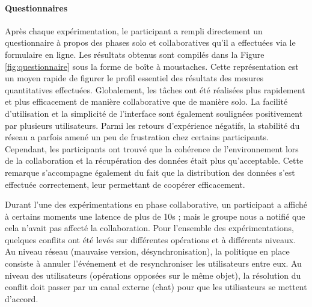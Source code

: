 \paragraph{Questionnaires}
Après chaque expérimentation, le participant a rempli directement un questionnaire 
à propos des phases solo et collaboratives qu'il a effectuées via le formulaire en 
ligne. Les résultats obtenus sont compilés dans la Figure 
\ref{fig:questionnaire} sous la forme de boîte à moustaches. Cette représentation 
est un moyen rapide de figurer le profil essentiel des résultats des mesures 
quantitatives effectuées.
Globalement, les tâches ont été réalisées plus rapidement et plus efficacement 
de manière collaborative que de manière solo. La facilité d'utilisation et la 
simplicité de l'interface sont également soulignées positivement par plusieurs 
utilisateurs. Parmi les retours d'expérience négatifs, la stabilité du 
réseau a parfois amené un peu de frustration chez certains participants. 
Cependant, les participants ont trouvé que la cohérence de l'environnement lors de 
la collaboration et la récupération des données était plus qu'acceptable. Cette 
remarque s'accompagne également du fait que la distribution des données s'est 
effectuée correctement, leur permettant de coopérer efficacement.

Durant l'une des expérimentations en phase collaborative, un 
participant a affiché à certains moments une latence de plus de 10s ; mais 
le groupe nous a notifié que cela n'avait pas affecté la collaboration. Pour l'ensemble des 
expérimentations, quelques conflits ont été levés sur différentes opérations et à
différents niveaux. Au niveau réseau (mauvaise version, désynchronisation), la 
politique en place consiste à annuler l'événement et de resynchroniser les utilisateurs 
entre eux. Au niveau des utilisateurs (opérations opposées sur le même objet), la 
résolution du conflit doit passer par un canal externe (chat) pour que les 
utilisateurs se mettent d'accord.  


